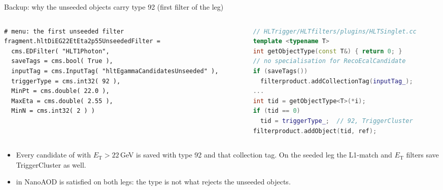 \begin{frame}[fragile]{Backup: why the unseeded objects carry type 92 (first filter of the leg)}
  \begin{columns}[T]
    \begin{column}{0.46\linewidth}
\begin{lstlisting}
# menu: the first unseeded filter
fragment.hltDiEG22EtEta2p55UnseededFilter =
  cms.EDFilter( "HLT1Photon",
  saveTags = cms.bool( True ),
  inputTag = cms.InputTag( "hltEgammaCandidatesUnseeded" ),
  triggerType = cms.int32( 92 ),
  MinPt = cms.double( 22.0 ),
  MaxEta = cms.double( 2.55 ),
  MinN = cms.int32( 2 ) )
\end{lstlisting}
    \end{column}
    \begin{column}{0.52\linewidth}
\begin{lstlisting}[language=C++]
// HLTrigger/HLTfilters/plugins/HLTSinglet.cc
template <typename T>
int getObjectType(const T&) { return 0; }
// no specialisation for RecoEcalCandidate
if (saveTags())
  filterproduct.addCollectionTag(inputTag_);
...
int tid = getObjectType<T>(*i);
if (tid == 0)
  tid = triggerType_;  // 92, TriggerCluster
filterproduct.addObject(tid, ref);
\end{lstlisting}
    \end{column}
  \end{columns}
  \par\vspace{4pt}
  \begin{itemize}\scriptsize
    \item Every candidate of  with $E_\mathrm{T}>22$\,GeV is saved with type 92 and
          that collection tag. On the seeded leg the L1-match and $E_\mathrm{T}$ filters save TriggerCluster as well.
    \item {} in NanoAOD is satisfied on both legs: the type is not what rejects the unseeded objects.
  \end{itemize}
\end{frame}

